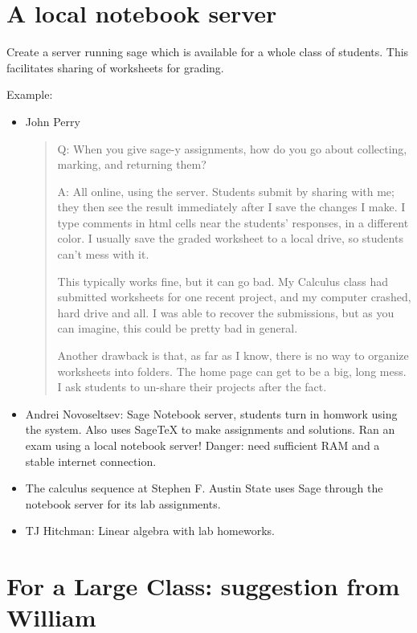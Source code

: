 \documentclass{article}
\begin{document}
\section{A local notebook server}

Create a server running sage which is available for a whole class of students. This facilitates sharing of worksheets for grading.

Example:
\begin{itemize}
\item John Perry
\begin{quotation}
Q: When you give sage-y assignments, how do you go about collecting, marking, and returning them?

A: All online, using the server. Students submit by sharing with me; they then see the result immediately after I save the changes I make. I type comments in html cells near the students' responses, in a different color. I usually save the graded worksheet to a local drive, so students can't mess with it.

This typically works fine, but it can go bad. My Calculus class had submitted worksheets for one recent project, and my computer crashed, hard drive and all. I was able to recover the submissions, but as you can imagine, this could be pretty bad in general.

Another drawback is that, as far as I know, there is no way to organize worksheets into folders. The home page can get to be a big, long mess. I ask students to un-share their projects after the fact.
\end{quotation}

\item Andrei Novoseltsev: Sage Notebook server, students turn in homwork using the system. Also uses SageTeX to make assignments and solutions. Ran an exam using a local notebook server! Danger: need sufficient RAM and a stable internet connection.

\item The calculus sequence at Stephen F. Austin State uses Sage through the notebook server for its lab assignments.

\item TJ Hitchman: Linear algebra with lab homeworks.

\end{itemize}

\clearpage

\section{For a Large Class: suggestion from William}
\end{document}
